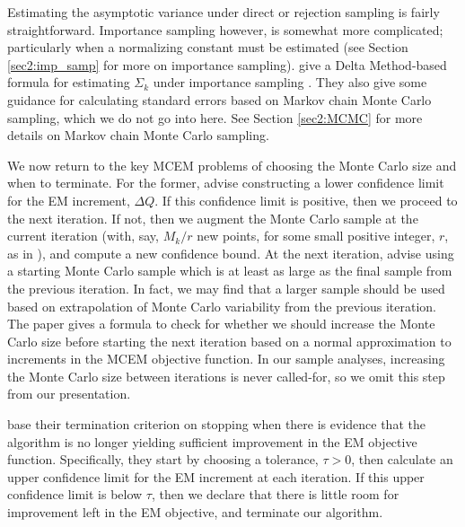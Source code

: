 \documentclass[11pt, oneside]{article}   	%
\begin{document}
Estimating the asymptotic variance under direct or rejection sampling is fairly straightforward. Importance sampling however, is somewhat more complicated; particularly when a normalizing constant must be estimated (see Section \ref{sec2:imp_samp} for more on importance sampling). \citeauthor{Caf05} give a Delta Method-based formula for estimating $\Sigma_k$ under importance sampling \citep[see Chapter 3 of][for an overview of the Delta Method]{van98}. They also give some guidance for calculating standard errors based on Markov chain Monte Carlo sampling, which we do not go into here. See Section \ref{sec2:MCMC} for more details on Markov chain Monte Carlo sampling. 

We now return to the key MCEM problems of choosing the Monte Carlo size and when to terminate. For the former, \citeauthor{Caf05} advise constructing a lower confidence limit for the EM increment, $\Delta Q$. If this confidence limit is positive, then we proceed to the next iteration. If not, then we augment the Monte Carlo sample at the current iteration (with, say, $M_k/r$ new points, for some small positive integer, $r$, as in \citealp{Boo99}), and compute a new confidence bound. At the next iteration, \citeauthor{Caf05} advise using a starting Monte Carlo sample which is at least as large as the final sample from the previous iteration. In fact, we may find that a larger sample should be used based on extrapolation of Monte Carlo variability from the previous iteration. The paper gives a formula to check for whether we should increase the Monte Carlo size before starting the next iteration based on a normal approximation to increments in the MCEM objective function. In our sample analyses, increasing the Monte Carlo size between iterations is never called-for, so we omit this step from our presentation.

\citeauthor{Caf05} base their termination criterion on stopping when there is evidence that the algorithm is no longer yielding sufficient improvement in the EM objective function. Specifically, they start by choosing a tolerance, $\tau>0$, then calculate an upper confidence limit for the EM increment at each iteration. If this upper confidence limit is below $\tau$, then we declare that there is little room for improvement left in the EM objective, and terminate our algorithm.
\end{document}
